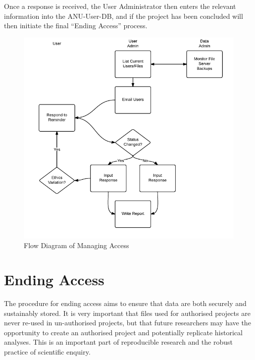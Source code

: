 \documentclass[a4paper]{article}
\begin{document}
Once a response is received, the User Administrator then enters the relevant information into the ANU-User-DB, and if the project has been concluded will then initiate the final ``Ending Access'' process.


\begin{figure}[!h]
\centering
\includegraphics[width=\textwidth]{MortalityManagingAccess.png}
\caption{Flow Diagram of Managing Access}
\label{fig:DataAccessFlowDiagram-ManagingAccess}
\end{figure}
\clearpage
\section{Ending Access}
\label{sec-4}

The procedure for ending access aims to ensure that data are both securely and sustainably stored.  It is very important that files used for authorised projects are never re-used in un-authorised projects, but that future researchers may have the opportunity to create an authorised project and potentially replicate historical analyses.  This is an important part of reproducible research and the robust practice of scientific enquiry.
\end{document}
